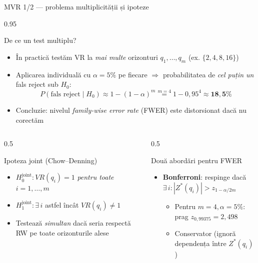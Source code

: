 \documentclass[9pt, aspectratio=169, t]{beamer}
\begin{document}
\begin{frame}[shrink=35]{MVR 1/2 --- problema multiplicității și ipoteze}
\begin{cminipage}{0.95\textwidth}
\begin{block}{De ce un test multiplu?}
\footnotesize
\begin{itemize}\setlength{\itemsep}{0pt}
    \item În practică testăm VR la \emph{mai multe} orizonturi $q_1, \ldots, q_m$ (ex. $\{2,4,8,16\}$)
    \item Aplicarea individuală cu $\alpha = 5\%$ pe fiecare $\Rightarrow$ probabilitatea de \emph{cel puțin un} fals reject sub $H_0$:
    \[
        P(\text{fals reject} \mid H_0) \approx 1 - (1 - \alpha)^m \overset{m=4}{=} 1 - 0{,}95^4 \approx \mathbf{18{,}5\%}
    \]
    \item Concluzie: nivelul \emph{family-wise error rate} (FWER) este distorsionat dacă nu corectăm
\end{itemize}
\end{block}
\begin{columns}[T]
\begin{column}{0.5\textwidth}
\begin{exampleblock}{Ipoteza joint (Chow--Denning)}
\footnotesize
\begin{itemize}\setlength{\itemsep}{0pt}
    \item $H_0^{\text{joint}}: VR(q_i) = 1$ \emph{pentru toate} $i = 1, \ldots, m$
    \item $H_1^{\text{joint}}: \exists\, i$ astfel încât $VR(q_i) \neq 1$
    \item Testează \emph{simultan} dacă seria respectă RW pe toate orizonturile alese
\end{itemize}
\end{exampleblock}
\end{column}
\begin{column}{0.5\textwidth}
\begin{exampleblock}{Două abordări pentru FWER}
\footnotesize
\begin{itemize}\setlength{\itemsep}{0pt}
    \item \textbf{Bonferroni}: respinge dacă $\exists\, i: |Z^*(q_i)| > z_{1-\alpha/2m}$
    \begin{itemize}\setlength{\itemsep}{0pt}
        \item Pentru $m=4, \alpha=5\%$: prag $z_{0{,}99375} = 2{,}498$
        \item Conservator (ignoră dependența între $Z^*(q_i)$)
    \end{itemize}

\end{itemize}
\end{exampleblock}
\end{column}
\end{columns}
\end{cminipage}
\end{frame}
\end{document}

